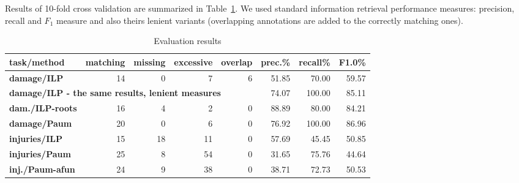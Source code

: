 \documentclass[runningheads,a4paper]{llncs}
\begin{document}


Results of 10-fold cross validation are summarized in Table~\ref{tab:EvaluationResults}. We used standard information retrieval performance measures: precision, recall and $F_1$ measure and also theirs lenient variants (overlapping annotations are added to the correctly matching ones).

\begin{table}[t]
	\centering
			
\begin{tabular}{|l||r|r|r|r|r|r|r|}
\hline
\textbf{task/method} & \textbf{matching} & \textbf{missing} & \textbf{excessive} & \textbf{overlap} & \textbf{prec.}\% & \textbf{recall}\% & \textbf{F1.0}\%\\
\hline
\hline
\textbf{damage/ILP} & 14 & 0 & 7 & 6 & 51.85 & 70.00 & 59.57\\
\hline
\multicolumn{5}{|l|}{\textbf{damage/ILP - the same results, lenient measures}} & 74.07 & 100.00 & 85.11\\
\hline
\textbf{dam./ILP-roots} & 16 & 4 & 2 & 0 & 88.89 & 80.00 & 84.21\\
\hline
\textbf{damage/Paum} & 20 & 0 & 6 & 0 & 76.92 & 100.00 & 86.96\\
\hline
\hline
\textbf{injuries/ILP} & 15 & 18 & 11 & 0 & 57.69 & 45.45 & 50.85\\
\hline
\textbf{injuries/Paum} & 25 & 8 & 54 & 0 & 31.65 & 75.76 & 44.64\\
\hline
\textbf{inj./Paum-afun} & 24 & 9 & 38 & 0 & 38.71 & 72.73 & 50.53\\
\hline
\end{tabular}
						
	\caption{Evaluation results }
	\label{tab:EvaluationResults}
\end{table}
\end{document}
